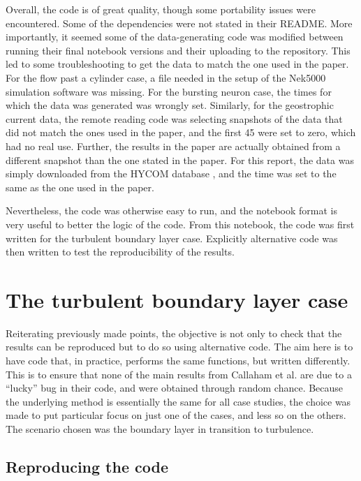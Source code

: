 \documentclass[12pt]{report} %
\begin{document}
Overall, the code is of great quality, though some portability issues were encountered. Some of the dependencies were not stated in their README. More importantly, it seemed some of the data-generating code was modified between running their final notebook versions and their uploading to the repository. This led to some troubleshooting to get the data to match the one used in the paper. For the flow past a cylinder case, a file needed in the setup of the Nek5000 simulation software was missing\cite{nek5000setup}. For the bursting neuron case, the times for which the data was generated was wrongly set. Similarly, for the geostrophic current data, the remote reading code was selecting snapshots of the data that did not match the ones used in the paper, and the first 45 were set to zero, which had no real use. Further, the results in the paper are actually obtained from a different snapshot than the one stated in the paper. For this report, the data was simply downloaded from the HYCOM database \cite{hycom}, and the time was set to the same as the one used in the paper.

Nevertheless, the code was otherwise easy to run, and the notebook format is very useful to better the logic of the code. From this notebook, the code was first written for the turbulent boundary layer case. Explicitly alternative code was then written to test the reproducibility of the results.

\section{The turbulent boundary layer case}

Reiterating previously made points, the objective is not only to check that the results can be reproduced but to do so using alternative code. The aim here is to have code that, in practice, performs the same functions, but written differently. This is to ensure that none of the main results from Callaham et al. are due to a “lucky” bug in their code, and were obtained through random chance. Because the underlying method is essentially the same for all case studies, the choice was made to put particular focus on just one of the cases, and less so on the others. The scenario chosen was the boundary layer in transition to turbulence.

\subsection{Reproducing the code}
\end{document}
